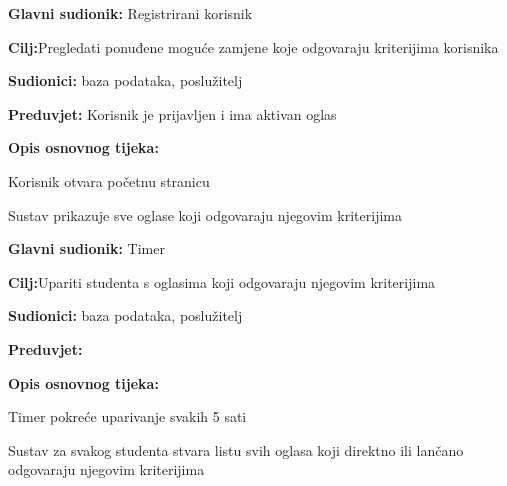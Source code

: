 \noindent {}
\begin{packed_item}
	
	\item \textbf{Glavni sudionik: }Registrirani korisnik
	\item  \textbf{Cilj:}Pregledati ponuđene moguće zamjene koje odgovaraju kriterijima korisnika
	\item  \textbf{Sudionici:} baza podataka, poslužitelj
	\item  \textbf{Preduvjet:} Korisnik je prijavljen i ima aktivan oglas
	\item  \textbf{Opis osnovnog tijeka:}
	
	\item[] \begin{packed_enum}
		
		\item Korisnik otvara početnu stranicu
		\item Sustav prikazuje sve oglase koji odgovaraju njegovim kriterijima
		
	\end{packed_enum}
\end{packed_item}
\noindent {}
\begin{packed_item}
	
	\item \textbf{Glavni sudionik: }Timer
	\item  \textbf{Cilj:}Upariti studenta s oglasima koji odgovaraju njegovim kriterijima
	\item  \textbf{Sudionici:} baza podataka, poslužitelj
	\item  \textbf{Preduvjet:}
	\item  \textbf{Opis osnovnog tijeka:}
	
	\item[] \begin{packed_enum}
		
		\item Timer pokreće uparivanje svakih 5 sati
		\item Sustav za svakog studenta stvara listu svih oglasa koji direktno ili lančano odgovaraju njegovim kriterijima
		
	\end{packed_enum}
\end{packed_item}

